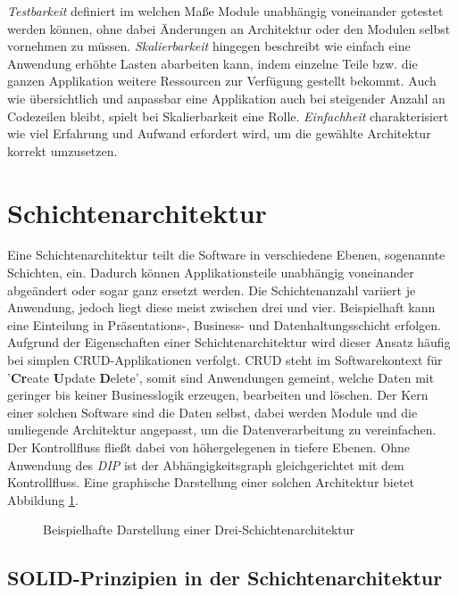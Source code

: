 \documentclass[conference]{IEEEtran}
\begin{document}
\emph{Testbarkeit} definiert im welchen Maße Module unabhängig voneinander getestet werden können, ohne dabei Änderungen an Architektur oder den Modulen selbst vornehmen zu müssen. \emph{Skalierbarkeit} hingegen beschreibt wie einfach eine Anwendung erhöhte Lasten abarbeiten kann, indem einzelne Teile bzw. die ganzen Applikation weitere Ressourcen zur Verfügung gestellt bekommt. Auch wie übersichtlich und anpassbar eine Applikation auch bei steigender Anzahl an Codezeilen bleibt, spielt bei Skalierbarkeit eine Rolle. \emph{Einfachheit} charakterisiert wie viel Erfahrung und Aufwand erfordert wird, um die gewählte Architektur korrekt umzusetzen.


\section{Schichtenarchitektur}

Eine Schichtenarchitektur teilt die Software in verschiedene Ebenen, sogenannte Schichten, ein. Dadurch können Applikationsteile unabhängig voneinander abgeändert oder sogar ganz ersetzt werden. Die Schichtenanzahl variiert je Anwendung, jedoch liegt diese meist zwischen drei und vier. Beispielhaft kann eine Einteilung in Präsentations-, Business- und Datenhaltungsschicht erfolgen. Aufgrund der Eigenschaften einer Schichtenarchitektur wird dieser Ansatz häufig bei simplen CRUD-Applikationen verfolgt. CRUD steht im Softwarekontext für '\textbf{Cr}eate \textbf{U}pdate \textbf{D}elete', somit sind Anwendungen gemeint, welche Daten mit geringer bis keiner Businesslogik erzeugen, bearbeiten und löschen. Der Kern einer solchen Software sind die Daten selbst, dabei werden Module und die umliegende Architektur angepasst, um die Datenverarbeitung zu vereinfachen. Der Kontrollfluss fließt dabei von höhergelegenen in tiefere Ebenen. Ohne Anwendung des \emph{DIP} ist der Abhängigkeitsgraph gleichgerichtet mit dem Kontrollfluss. Eine graphische Darstellung einer solchen Architektur bietet Abbildung \ref{Schichtenarchitektur}.


\begin{figure}[htbp]
	\small
	
	\caption{Beispielhafte Darstellung einer Drei-Schichtenarchitektur}
	\label{Schichtenarchitektur}
\end{figure}


\subsection{SOLID-Prinzipien in der Schichtenarchitektur}
\end{document}
